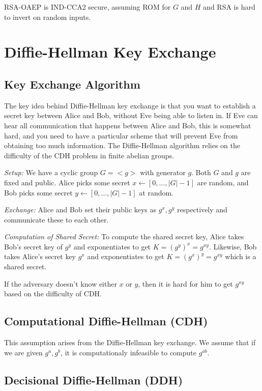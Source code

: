 \documentclass[psamsfonts]{amsart}
\begin{document}
RSA-OAEP is IND-CCA2 secure, assuming ROM for $G$ and $H$ and RSA is hard to invert on random inputs.

\section{Diffie-Hellman Key Exchange}

\subsection{Key Exchange Algorithm}

The key idea behind Diffie-Hellman key exchange is that you want to establish a secret key between Alice and Bob, without Eve being able to listen in. If Eve can hear all communication that happens between Alice and Bob, this is somewhat hard, and you need to have a particular scheme that will prevent Eve from obtaining too much information. The Diffie-Hellman algorithm relies on the difficulty of the CDH problem in finite abelian groups.

\emph{Setup:} We have a cyclic group $G = <g>$ with generator $g$. Both $G$ and $g$ are fixed and public. Alice picks some secret $x \leftarrow [0,\ldots,|G|-1]$ are random, and Bob picks some secret $y \leftarrow [0, \ldots, |G|-1]$ at random.

\emph{Exchange:} Alice and Bob set their public keys as $g^x, g^y$ respectively and communicate these to each other.

\emph{Computation of Shared Secret:} To compute the shared secret key, Alice takes Bob's secret key of $g^y$ and exponentiates to get $K = (g^y)^x = g^{xy}$. Likewise, Bob takes Alice's secret key $g^x$ and exponentiates to get $K = (g^x)^y = g^{xy}$ which is a shared secret.

If the adversary doesn't know either $x$ or $y$, then it is hard for him to get $g^{xy}$ based on the difficulty of CDH.

\subsection{Computational Diffie-Hellman (CDH)}

This assumption arises from the Diffie-Hellman key exchange. We assume that if we are given $g^a, g^b$, it is computationaly infeasible to compute $g^{ab}$.

\subsection{Decisional Diffie-Hellman (DDH)}
\end{document}
